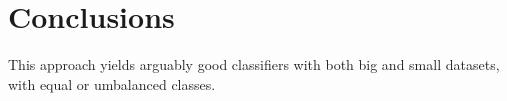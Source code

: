 \providecommand{\main}{.}





{\hypersetup{hidelinks}
  \tableofcontents
}






\chapter{Conclusions}
This approach yields arguably good classifiers with both big and small datasets, with equal or umbalanced classes.




